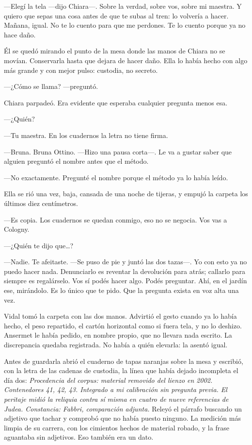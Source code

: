 ---Elegí la tela ---dijo Chiara---. Sobre la verdad, sobre vos, sobre mi maestra. Y quiero que sepas una cosa antes de que te subas al tren: lo volvería a hacer. Mañana, igual. No te lo cuento para que me perdones. Te lo cuento porque ya no hace daño.

Él se quedó mirando el punto de la mesa donde las manos de Chiara no se movían. Conservarla hasta que dejara de hacer daño. Ella lo había hecho con algo más grande y con mejor pulso: custodia, no secreto.

---¿Cómo se llama? ---preguntó.

Chiara parpadeó. Era evidente que esperaba cualquier pregunta menos esa.

---¿Quién?

---Tu maestra. En los cuadernos la letra no tiene firma.

---Bruna. Bruna Ottino. ---Hizo una pausa corta---. Le va a gustar saber que alguien preguntó el nombre antes que el método.

---No exactamente. Pregunté el nombre porque el método ya lo había leído.

Ella se rió una vez, baja, cansada de una noche de tijeras, y empujó la carpeta los últimos diez centímetros.

---Es copia. Los cuadernos se quedan conmigo, eso no se negocia. Vos vas a Cologny.

---¿Quién te dijo que\ldots{}?

---Nadie. Te afeitaste. ---Se puso de pie y juntó las dos tazas---. Yo con esto ya no puedo hacer nada. Denunciarlo es reventar la devolución para atrás; callarlo para siempre es regalárselo. Vos sí podés hacer algo. Podés preguntar. Ahí, en el jardín ese, mirándolo. Es lo único que te pido. Que la pregunta exista en voz alta una vez.

Vidal tomó la carpeta con las dos manos. Advirtió el gesto cuando ya lo había hecho, el peso repartido, el cartón horizontal como si fuera tela, y no lo deshizo. Ansermet le había pedido, en nombre propio, que no llevara nada escrito. La discrepancia quedaba registrada. No había a quién elevarla: la asentó igual.

Antes de guardarla abrió el cuaderno de tapas naranjas sobre la mesa y escribió, con la letra de las cadenas de custodia, la línea que había dejado incompleta el día dos: \textit{Procedencia del corpus: material removido del lienzo en 2002. Contenedores 41, 42, 43. Integrado a mi calibración sin pregunta previa. El peritaje midió la reliquia contra sí misma en cuatro de nueve referencias de Judea. Constancia: Fabbri, comparación adjunta.} Releyó el párrafo buscando un adjetivo que tachar y comprobó que no había puesto ninguno. La medición más limpia de su carrera, con los cimientos hechos de material robado, y la frase aguantaba sin adjetivos. Eso también era un dato.

